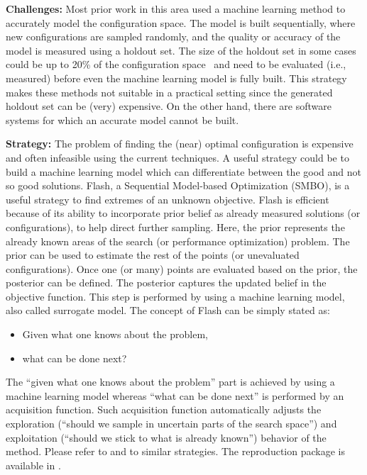 \documentclass[sigconf,anonymous,review]{acmart}
\newcommand\TODO[1]{\textcolor{ScarletRed}{\textbf{\colorbox{yellow}{\small TODO:}} \emph{#1}}\xspace}
\begin{document}
\noindent\textbf{Challenges: } Most prior work in this area used a machine learning method to accurately model the
configuration space. 
The model is built sequentially, where new configurations are sampled randomly, and the quality
or accuracy of the model is measured using a holdout set. The size of the holdout set in some cases could be up to 20\% of the configuration space~\cite{nair2017using} and need to be evaluated (i.e., measured) before even the machine learning model is fully built. This strategy makes these methods not suitable in a practical setting since the generated holdout set can be (very) expensive. On the other hand, there are software systems for which an accurate model cannot be built. 

\noindent\textbf{Strategy: } The problem of finding the (near) optimal configuration is expensive and often infeasible using the current techniques. A useful strategy could be to build a machine learning model which can differentiate between the good and not so good solutions. Flash, a Sequential Model-based Optimization (SMBO), is a useful
strategy to find extremes of an unknown objective. Flash is
efficient because of its ability to incorporate prior belief as
already measured solutions (or configurations), to help direct
further sampling. Here, the prior represents the already
known areas of the search (or performance optimization) problem. The prior can be used to estimate the rest of the
points (or unevaluated configurations). Once one (or many) points are evaluated based on the prior,
the posterior can be defined. The posterior captures the updated belief in
the objective function. This step is performed by using a
machine learning model, also called surrogate model. 
The concept of Flash can be simply stated as:
\begin{itemize}[leftmargin=*]
\item Given what one knows about the problem,
\item what can be done next?
\end{itemize}
The ``given what one knows about the problem'' part is
achieved by using a machine learning model whereas ``what can be done next'' is performed by an acquisition function.
Such acquisition function automatically adjusts the exploration
(``should we sample in uncertain parts of the search
space'') and exploitation (``should we stick to what is already
known'') behavior of the method. Please refer to  \cite{nair2018finding} and  \cite{nair2017using,nair2017faster, jamshidi2016uncertainty} to similar strategies. The reproduction package is available in .
\end{document}
